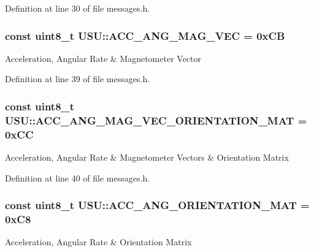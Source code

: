 \-Definition at line 30 of file messages.\-h.

\hypertarget{namespace_u_s_u_ad03e7c0f41fd47a68a9f33abde73932a}{
\subsubsection[{\-A\-C\-C\-\_\-\-A\-N\-G\-\_\-\-M\-A\-G\-\_\-\-V\-E\-C}]{\setlength{\rightskip}{0pt plus 5cm}const uint8\-\_\-t {\bf \-U\-S\-U\-::\-A\-C\-C\-\_\-\-A\-N\-G\-\_\-\-M\-A\-G\-\_\-\-V\-E\-C} = 0x\-C\-B}}\label{namespace_u_s_u_ad03e7c0f41fd47a68a9f33abde73932a}
\-Acceleration, \-Angular \-Rate \& \-Magnetometer \-Vector 

\-Definition at line 39 of file messages.\-h.

\hypertarget{namespace_u_s_u_adb9724de65ce9a212dd8611f69d241f0}{
\subsubsection[{\-A\-C\-C\-\_\-\-A\-N\-G\-\_\-\-M\-A\-G\-\_\-\-V\-E\-C\-\_\-\-O\-R\-I\-E\-N\-T\-A\-T\-I\-O\-N\-\_\-\-M\-A\-T}]{\setlength{\rightskip}{0pt plus 5cm}const uint8\-\_\-t {\bf \-U\-S\-U\-::\-A\-C\-C\-\_\-\-A\-N\-G\-\_\-\-M\-A\-G\-\_\-\-V\-E\-C\-\_\-\-O\-R\-I\-E\-N\-T\-A\-T\-I\-O\-N\-\_\-\-M\-A\-T} = 0x\-C\-C}}\label{namespace_u_s_u_adb9724de65ce9a212dd8611f69d241f0}
\-Acceleration, \-Angular \-Rate \& \-Magnetometer \-Vectors \& \-Orientation \-Matrix 

\-Definition at line 40 of file messages.\-h.

\hypertarget{namespace_u_s_u_a13f66b9f78d1a3e9778bce391ab41b5e}{
\subsubsection[{\-A\-C\-C\-\_\-\-A\-N\-G\-\_\-\-O\-R\-I\-E\-N\-T\-A\-T\-I\-O\-N\-\_\-\-M\-A\-T}]{\setlength{\rightskip}{0pt plus 5cm}const uint8\-\_\-t {\bf \-U\-S\-U\-::\-A\-C\-C\-\_\-\-A\-N\-G\-\_\-\-O\-R\-I\-E\-N\-T\-A\-T\-I\-O\-N\-\_\-\-M\-A\-T} = 0x\-C8}}\label{namespace_u_s_u_a13f66b9f78d1a3e9778bce391ab41b5e}
\-Acceleration, \-Angular \-Rate \& \-Orientation \-Matrix 

